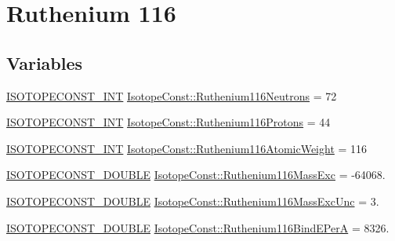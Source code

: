 \hypertarget{group___isotope_const-_ruthenium-_ru116}{}\section{Ruthenium 116}
\label{group___isotope_const-_ruthenium-_ru116}
\subsection*{Variables}
\begin{DoxyCompactItemize}
\item 
\mbox{\hyperlink{group___isotope_const-_macros_ga5f18360b3e99483a35c32d789e62621c}{I\+S\+O\+T\+O\+P\+E\+C\+O\+N\+S\+T\+\_\+\+I\+NT}} \mbox{\hyperlink{group___isotope_const-_ruthenium-_ru116_ga278eb228750bd4c36424c0814beeaeea}{Isotope\+Const\+::\+Ruthenium116\+Neutrons}} = 72
\item 
\mbox{\hyperlink{group___isotope_const-_macros_ga5f18360b3e99483a35c32d789e62621c}{I\+S\+O\+T\+O\+P\+E\+C\+O\+N\+S\+T\+\_\+\+I\+NT}} \mbox{\hyperlink{group___isotope_const-_ruthenium-_ru116_gaa82c8fbe61707b79f6373d5f6547a603}{Isotope\+Const\+::\+Ruthenium116\+Protons}} = 44
\item 
\mbox{\hyperlink{group___isotope_const-_macros_ga5f18360b3e99483a35c32d789e62621c}{I\+S\+O\+T\+O\+P\+E\+C\+O\+N\+S\+T\+\_\+\+I\+NT}} \mbox{\hyperlink{group___isotope_const-_ruthenium-_ru116_gaf58f30cfdf4ac157334e8364e450cefe}{Isotope\+Const\+::\+Ruthenium116\+Atomic\+Weight}} = 116
\item 
\mbox{\hyperlink{group___isotope_const-_macros_ga8f45a7272ce02c0b4c65c44636ed719a}{I\+S\+O\+T\+O\+P\+E\+C\+O\+N\+S\+T\+\_\+\+D\+O\+U\+B\+LE}} \mbox{\hyperlink{group___isotope_const-_ruthenium-_ru116_ga0222b36f86c37ecb3cae0e6e3cde6cd3}{Isotope\+Const\+::\+Ruthenium116\+Mass\+Exc}} = -\/64068.
\item 
\mbox{\hyperlink{group___isotope_const-_macros_ga8f45a7272ce02c0b4c65c44636ed719a}{I\+S\+O\+T\+O\+P\+E\+C\+O\+N\+S\+T\+\_\+\+D\+O\+U\+B\+LE}} \mbox{\hyperlink{group___isotope_const-_ruthenium-_ru116_ga3a5370321cb8f76c7578a0c1cc44ba3b}{Isotope\+Const\+::\+Ruthenium116\+Mass\+Exc\+Unc}} = 3.
\item 
\mbox{\hyperlink{group___isotope_const-_macros_ga8f45a7272ce02c0b4c65c44636ed719a}{I\+S\+O\+T\+O\+P\+E\+C\+O\+N\+S\+T\+\_\+\+D\+O\+U\+B\+LE}} \mbox{\hyperlink{group___isotope_const-_ruthenium-_ru116_gab1f11004ec8e5734d47ea354e2656ee9}{Isotope\+Const\+::\+Ruthenium116\+Bind\+E\+PerA}} = 8326.
\item 

\end{DoxyCompactItemize}
